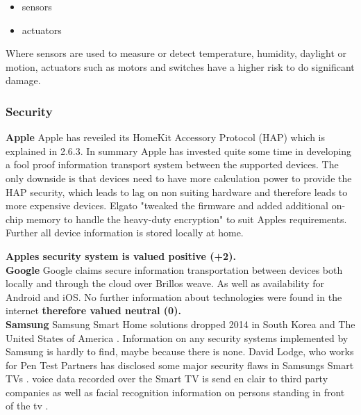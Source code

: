			\begin{itemize}
				\item sensors
				\item actuators 
			\end{itemize}
			
			Where sensors are used to measure or detect temperature, humidity, daylight or motion, actuators such as motors and switches have a higher risk to do significant damage. 

		\subsubsection{Security}
			\textbf{Apple}
				Apple has reveiled its HomeKit Accessory Protocol (HAP) which is explained in 2.6.3. In summary Apple has invested quite some time in developing a fool proof information transport system between the supported devices. The only downside is that devices need to have more calculation power to provide the HAP security, which leads to lag on non suiting hardware and therefore leads to more expensive devices. Elgato "tweaked the firmware and added additional on-chip memory to handle the heavy-duty encryption" \parencite{HomeKitComputingPower} to suit Apples requirements. Further all device information is stored locally at home.


				\textbf{Apples security system is valued positive (+2).}\\

			\textbf{Google}
				Google claims secure information transportation between devices both locally and through the cloud over Brillos weave. As well as availability for Android and iOS. No further information about technologies were found in the internet \textbf{therefore valued neutral (0).}\\

			\textbf{Samsung}
				Samsung Smart Home solutions dropped 2014 in South Korea and The United States of America \parencite{SamsungComputerBild}. Information on any security systems implemented by Samsung is hardly to find, maybe because there is none. David Lodge, who works for Pen Test Partners has disclosed some major security flaws in Samsungs Smart TVs \parencite{SamsungEncryption}. voice data recorded over the Smart TV is send en clair to third party companies as well as facial recognition information on persons standing in front of the tv \parencite{SamsungEncryption}. 


